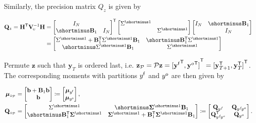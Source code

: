 \documentclass[notitlepage,a4paper,12pt]{article}
\newcommand{\transpose}[1]{{#1}^{\sf{T}}}
\begin{document}
Similarly, the precision matrix $Q_z$ is given by

\begin{align*}
    \mathbf{Q}_z = \transpose{\mathbf{H}} \mathbf{V}_{\!\upsilon}^{-1} \mathbf{H} &= 
    \transpose{
    \begin{bmatrix}
        I_N \\
        \shortminus\mathbf{B}_1 & I_N 
    \end{bmatrix}
    }
    \begin{bmatrix}
        \Sigma^{\shortminus 1} & \\
        &\Sigma^{\shortminus 1} 
    \end{bmatrix}
    \begin{bmatrix}
        I_N &  \shortminus\mathbf{B}_1 \\
        & I_N 
    \end{bmatrix}
    \\
    &= 
    \begin{bmatrix}
        \Sigma^{\shortminus 1} + \mathbf{B}^{\sf{T}}_1\Sigma^{\shortminus 1}\mathbf{B}_1 & \shortminus\mathbf{B}^{\sf{T}}_1\Sigma^{\shortminus 1}  \\
        \shortminus\Sigma^{\shortminus 1}\mathbf{B}_1 & \Sigma^{\shortminus 1} 
    \end{bmatrix}
\end{align*}

Permute $\mathbf{z}$ such that $\mathbf{y}_T$ is ordered last, i.e. $\mathbf{z}_{\mathcal{P}} = \mathcal{P} \mathbf{z}  = \transpose{[\transpose{\mathbf{y}^{\sf{f}}}, \transpose{\mathbf{y}^o}]} = \transpose{[\mathbf{y}^{\sf{T}}_{T+1}, \mathbf{y}^{\sf{T}}_T]}$. The corresponding moments with partitions $y^{\sf{f}}$ and $y^{\sf{o}}$ are then given by

\begin{align*}
\boldsymbol{\mu}_{z_{\mathcal{P}}} &= 
\begin{bmatrix}
    \mathbf{b} + \mathbf{B}_1\mathbf{b} \\
    \mathbf{b} 
\end{bmatrix}
\coloneqq
\begin{bmatrix}
    \boldsymbol{\mu}_{y^{\sf{f}}} \\
    \boldsymbol{\mu}_{y^{\sf{o}}}
\end{bmatrix}
,\\
\mathbf{Q}_{z_{\mathcal{P}}} &= 
\begin{bmatrix}
    \Sigma^{\shortminus 1}   & \shortminus\boldsymbol{\Sigma}^{\shortminus 1}\mathbf{B}_1 \\
    \shortminus\mathbf{B}^{\sf{T}}_1\boldsymbol{\Sigma}^{\shortminus 1} & \boldsymbol{\Sigma}^{\shortminus 1} + \mathbf{B}^{\sf{T}}_1\boldsymbol{\Sigma}^{\shortminus 1}\mathbf{B}_1
\end{bmatrix}
\coloneqq
\begin{bmatrix}
    \mathbf{Q}_{y^f} & \mathbf{Q}_{y^f\!y^o} \\
    \mathbf{Q}^{\sf{T}}_{y^f\!y^o} & \mathbf{Q}_{y^o}
\end{bmatrix}
.
\end{align*}
\end{document}
